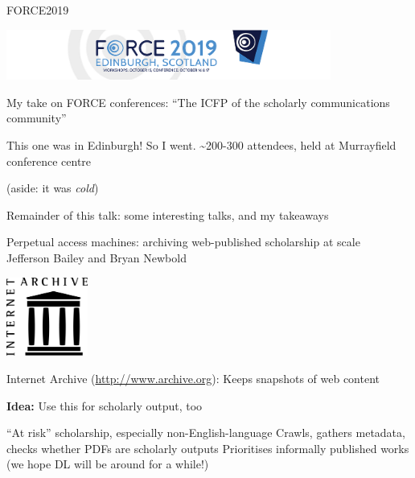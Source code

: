 \documentclass[11.5pt, aspectratio=169]{beamer}
\begin{document}
\begin{frame}{FORCE2019}
  \begin{center}
    \includegraphics[width=0.8\textwidth]{images/force2019.png}
  \end{center}

  \begin{fullpageitemize}
  \item My take on FORCE conferences: ``The ICFP of the scholarly communications community''
  \item This one was in Edinburgh! So I went. \textasciitilde 200-300 attendees, held at Murrayfield conference centre
    \begin{itemize}
      \itemR (aside: it was \emph{cold})
    \end{itemize}
  \item Remainder of this talk: some interesting talks, and my takeaways
  \end{fullpageitemize}
\end{frame}


\begin{frame}{Perpetual access machines: archiving web-published scholarship at scale \\ {\small Jefferson Bailey and Bryan Newbold}}
  \begin{center}
    \includegraphics[width=0.2\textwidth]{images/internet-archive.png}
  \end{center}

  \begin{fullpageitemize}
    \item Internet Archive (\url{http://www.archive.org}): Keeps snapshots of web content
    \item \textbf{Idea:} Use this for scholarly output, too
      \begin{itemize}
        \itemR ``At risk'' scholarship, especially non-English-language
        \itemR Crawls, gathers metadata, checks whether PDFs are scholarly outputs
        \itemR Prioritises informally published works (we hope DL will be around for a while!)
      \end{itemize}
  \end{fullpageitemize}
\end{frame}
\end{document}
